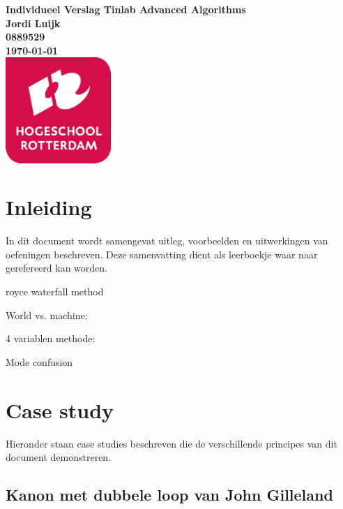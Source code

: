 \documentclass{article}
\begin{document}
\sffamily



\begin{titlepage}
  \centering
    \vfill
    {\bfseries\Huge
      Individueel Verslag Tinlab Advanced Algorithms \\
        \vskip2cm
      }
      {\bfseries\Large
        Jordi Luijk\\
      }
      {
        \bfseries\normalsize
        0889529\\
        \vskip1cm
        \today\\
    }    
    \vfill
    \includegraphics[width=4cm]{logohr.png} %
    \vfill
    \vfill
\end{titlepage}
\newpage
\tableofcontents

\newpage
\section{Inleiding}
In dit document wordt samengevat uitleg, voorbeelden en uitwerkingen van oefeningen beschreven. Deze samenvatting dient als leerboekje waar naar gerefereerd kan worden. 


royce waterfall method






World vs. machine:



4 variablen methode:


Mode confusion 




\section{Case study}
Hieronder staan case studies beschreven die de verschillende principes van dit document demonstreren.

\subsection{Kanon met dubbele loop van John Gilleland}
\end{document}
